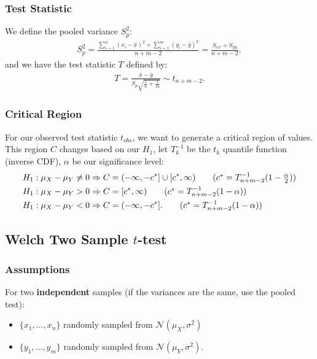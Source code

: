 \documentclass[a4paper, 12pt, twoside]{article}
\begin{document}
\subsubsection{Test Statistic}

We define the pooled variance $S_p^2$:
\begin{align*}
    S_p^2 = \frac{\sum_{i = 1}^n (x_i - \overline{x})^2
        + \sum_{i = 1}^m (y_i - \overline{y})^2}{n + m - 2}
    = \frac{S_{xx} + S_{yy}}{n + m - 2},
\end{align*}
and we have the test statistic $T$ defined by:
\begin{align*}
    T = \frac{\overline{x} - \overline{y}}
    {S_p\sqrt{\frac{1}{n} + \frac{1}{m}}} \sim t_{n + m - 2}.
\end{align*}

\subsubsection{Critical Region}

For our observed test statistic $t_{obs}$, we want to generate a
critical region of values. This region $C$ changes based on our
$H_1$, let $T^{-1}_k$ be the $t_k$ quantile function (inverse CDF),
$\alpha$ be our significance level:
\begin{align*}
    H_1 : \mu_X - \mu_Y \neq 0 & \Rightarrow
    C = (-\infty, -c^*] \cup [c^*, \infty)
    \tag{$ c^* = T^{-1}_{n + m - 2}(1 - \frac{\alpha}{2}) $}         \\
    H_1 : \mu_X - \mu_Y > 0    & \Rightarrow
    C = [c^*, \infty) \tag{$ c^* = T^{-1}_{n + m - 2}(1 - \alpha) $} \\
    H_1 : \mu_X - \mu_Y < 0    & \Rightarrow C = (-\infty, -c^*].
    \tag{$ c^* = T^{-1}_{n + m - 2}(1 - \alpha) $}
\end{align*}

\newpage

\subsection{Welch Two Sample $t$-test}

\subsubsection{Assumptions}

For two \textbf{independent} samples (if the variances are the
same, use the pooled test):
\begin{itemize}
    \item $\{x_1, \ldots, x_n\}$ randomly sampled from
          $\mathcal{N}(\mu_X, \sigma^2)$
    \item $\{y_1, \ldots, y_m\}$
          randomly sampled from $\mathcal{N}(\mu_Y, \sigma^2)$.
\end{itemize}
\end{document}
